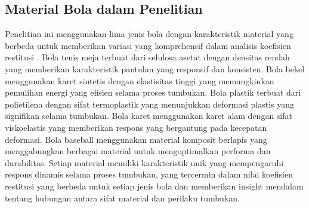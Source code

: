 \subsection{Material Bola dalam Penelitian}
Penelitian ini menggunakan lima jenis bola dengan karakteristik material yang berbeda untuk memberikan variasi yang komprehensif dalam analisis koefisien restitusi \citep{avancini2020physical}. Bola tenis meja terbuat dari selulosa asetat dengan densitas rendah yang memberikan karakteristik pantulan yang responsif dan konsisten. Bola bekel menggunakan karet sintetis dengan elastisitas tinggi yang memungkinkan pemulihan energi yang efisien selama proses tumbukan. Bola plastik terbuat dari polietilena dengan sifat termoplastik yang menunjukkan deformasi plastis yang signifikan selama tumbukan. Bola karet menggunakan karet alam dengan sifat viskoelastis yang memberikan respons yang bergantung pada kecepatan deformasi. Bola baseball menggunakan material komposit berlapis yang menggabungkan berbagai material untuk mengoptimalkan performa dan durabilitas. Setiap material memiliki karakteristik unik yang mempengaruhi respons dinamis selama proses tumbukan, yang tercermin dalam nilai koefisien restitusi yang berbeda untuk setiap jenis bola dan memberikan insight mendalam tentang hubungan antara sifat material dan perilaku tumbukan.